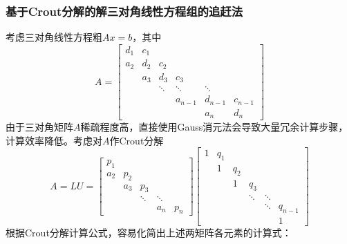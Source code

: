 \documentclass[UTF8,a4paper,10pt]{ctexart}
\begin{document}
            \subsubsection{基于Crout分解的解三对角线性方程组的追赶法}
                \par
                考虑三对角线性方程粗$Ax=b$，其中
                $$
                A=
                    \begin{bmatrix}
                        d_1 & c_1 & \  & \  & \  & \  \\
                        a_2 & d_2 & c_2 & \  & \  & \  \\
                        \  & a_3 & d_3 & c_3 & \  & \  \\
                        \  & \  & \ddots & \ddots & \ddots & \  \\
                        \  & \  & \  & a_{n-1} & d_{n-1} & c_{n-1} \\
                        \  & \  & \  & \  & a_n & d_n
                    \end{bmatrix}
                $$
                由于三对角矩阵$A$稀疏程度高，直接使用Gauss消元法会导致大量冗余计算步骤，计算效率降低。考虑对$A$作Crout分解
                $$
                A=LU=
                    \begin{bmatrix}
                        p_1 & \  & \  & \  \\
                        a_2 & p_2 & \  & \  & \  \\
                        \  & a_3 & p_3 & \  & \  \\
                        \  & \  & \ddots & \ddots & \  \\
                        \  & \  & \  & a_n & p_n
                    \end{bmatrix}
                    \begin{bmatrix}
                        1 & q_1  & \  & \  \\
                        \  & 1 & q_2  & \  & \  \\
                        \  & \  & 1 & q_3  & \  \\
                        \  & \  & \  & \ddots & \ddots & \  \\
                        \  & \  & \  & \  & \ddots & q_{n-1} \\
                        \  & \  & \  & \  & \  & 1
                    \end{bmatrix}
                $$
                根据Crout分解计算公式，容易化简出上述两矩阵各元素的计算式：
\end{document}
